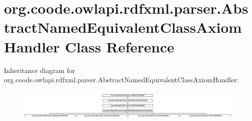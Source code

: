 \hypertarget{classorg_1_1coode_1_1owlapi_1_1rdfxml_1_1parser_1_1_abstract_named_equivalent_class_axiom_handler}{\section{org.\-coode.\-owlapi.\-rdfxml.\-parser.\-Abstract\-Named\-Equivalent\-Class\-Axiom\-Handler Class Reference}
\label{classorg_1_1coode_1_1owlapi_1_1rdfxml_1_1parser_1_1_abstract_named_equivalent_class_axiom_handler}
}
Inheritance diagram for org.\-coode.\-owlapi.\-rdfxml.\-parser.\-Abstract\-Named\-Equivalent\-Class\-Axiom\-Handler\-:\begin{figure}[H]
\begin{center}
\leavevmode
\includegraphics[height=1.538462cm]{classorg_1_1coode_1_1owlapi_1_1rdfxml_1_1parser_1_1_abstract_named_equivalent_class_axiom_handler}
\end{center}
\end{figure}
